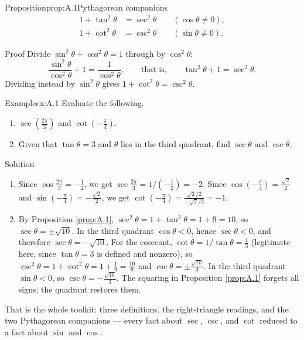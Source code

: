 \documentclass[a4paper,12pt,oneside]{memoir}
\begin{document}
\begin{envproposition}{Proposition}{prop:A.1}{Pythagorean companions}
\[ \begin{aligned} 1 + \tan^{2}\theta &= \sec^{2}\theta \qquad (\cos\theta \neq 0), \\ 1 + \cot^{2}\theta &= \csc^{2}\theta \qquad (\sin\theta \neq 0). \end{aligned} \]
\end{envproposition}
\begin{envproof}{Proof}{}{}
Divide \(\sin^{2}\theta + \cos^{2}\theta = 1\) through by \(\cos^{2}\theta\): \[ \frac{\sin^{2}\theta}{\cos^{2}\theta} + 1 = \frac{1}{\cos^{2}\theta}, \qquad\text{that is,}\qquad \tan^{2}\theta + 1 = \sec^{2}\theta. \] Dividing instead by \(\sin^{2}\theta\) gives \(1 + \cot^{2}\theta = \csc^{2}\theta\). \qedmark
\end{envproof}
\begin{workedexample}
\begin{envexample}{Example}{ex:A.1}{}
Evaluate the following.

\begin{enumerate}
  \item \(\sec\!\left(\tfrac{2\pi}{3}\right)\) and \(\cot\!\left(-\tfrac{\pi}{4}\right)\).
  \item Given that \(\tan\theta = 3\) and \(\theta\) lies in the third quadrant, find \(\sec\theta\) and \(\csc\theta\).
\end{enumerate}
\end{envexample}
\begin{envsolution}{Solution}{}{}
\begin{enumerate}
  \item Since \(\cos\tfrac{2\pi}{3} = -\tfrac{1}{2}\), we get \(\sec\tfrac{2\pi}{3} = 1/(-\tfrac{1}{2}) = -2\). Since \(\cos(-\tfrac{\pi}{4}) = \tfrac{\sqrt{2}}{2}\) and \(\sin(-\tfrac{\pi}{4}) = -\tfrac{\sqrt{2}}{2}\), we get \(\cot(-\tfrac{\pi}{4}) = \frac{\sqrt{2}/2}{-\sqrt{2}/2} = -1\).
  \item By Proposition \ref{prop:A.1}, \(\sec^{2}\theta = 1 + \tan^{2}\theta = 1 + 9 = 10\), so \(\sec\theta = \pm\sqrt{10}\). In the third quadrant \(\cos\theta < 0\), hence \(\sec\theta < 0\), and therefore \(\sec\theta = -\sqrt{10}\). For the cosecant, \(\cot\theta = 1/\tan\theta = \tfrac{1}{3}\) (legitimate here, since \(\tan\theta = 3\) is defined and nonzero), so \(\csc^{2}\theta = 1 + \cot^{2}\theta = 1 + \tfrac{1}{9} = \tfrac{10}{9}\) and \(\csc\theta = \pm\tfrac{\sqrt{10}}{3}\). In the third quadrant \(\sin\theta < 0\), so \(\csc\theta = -\tfrac{\sqrt{10}}{3}\). The squaring in Proposition \ref{prop:A.1} forgets all signs; the quadrant restores them.
\end{enumerate}
\end{envsolution}
\end{workedexample}
That is the whole toolkit: three definitions, the right-triangle readings, and the two Pythagorean companions — every fact about \(\sec\), \(\csc\), and \(\cot\) reduced to a fact about \(\sin\) and \(\cos\).
\end{document}
